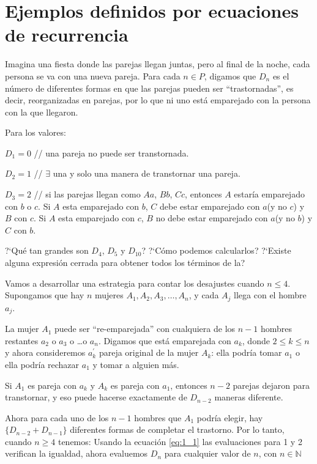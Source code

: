 \section{Ejemplos definidos por ecuaciones de recurrencia}
\begin{example}{}
	Imagina una fiesta donde las parejas llegan juntas, pero al final de la noche, cada persona se va con una nueva pareja. Para cada $n\in P$, digamos que $D_{n}$ es el número de diferentes formas en que las parejas pueden ser ``trastornadas'', es decir, reorganizadas en parejas, por lo que ni uno está emparejado con la persona con la que llegaron.
	
	Para los valores:
	
	$D_{1} = 0$  // una pareja no puede ser transtornada.
	
	$D_{2} = 1$  // $\exists$ una y solo una manera de transtornar una pareja.
	
	$D_{3} = 2$  // si las parejas llegan como $Aa$, $Bb$, $Cc$, entonces $A$ estaría emparejado con $b$ o $c$. Si $A$ esta emparejado con $b$, $C$ debe estar emparejado con $a$(y no $c$) y $B$ con $c$. Si $A$ esta emparejado con $c$, $B$ no debe estar emparejado con $a$(y no $b$) y $C$ con $b$.
	
	?`Qué tan grandes son $D_{4}$, $D_{5}$ y $D_{10}$? ?`Cómo podemos calcularlos? ?`Existe alguna expresión cerrada para obtener todos los términos de la? %
	
	Vamos a desarrollar una estrategia para contar los desajustes cuando $n\leq4$. Supongamos que hay $n$ mujeres $A_{1},A_{2},A_{3},\ldots,A_{n}$, y cada $A_{j}$ llega con el hombre $a_{j}$.
	
	La mujer $A_{1}$ puede ser ``re-emparejada'' con cualquiera de los $n-1$ hombres restantes $a_{2}$ o $a_{3}$ o \ldots o $a_{n}$. Digamos que está emparejada con $a_{k}$, donde $2\leq k\leq n$ y ahora consideremos $a_{k}^{\prime}$ pareja original de la mujer $A_{k}$: ella podría tomar $a_{1}$ o ella podría rechazar $a_{1}$ y tomar a alguien más.
	
	Si $A_{1}$ es pareja con $a_{k}$ y $A_{k}$ es pareja con $a_{1}$, entonces $n-2$ parejas dejaron para transtornar, y eso puede hacerse exactamente de $D_{n-2}$ maneras diferente.
	
	Ahora para cada uno de los $n-1$ hombres que $A_{1}$ podría elegir, hay $\{D_{n-2}+ D_{n-1}\}$ diferentes formas de completar el trastorno. Por lo tanto, cuando $n\geq 4$ tenemos:
Usando la ecuación \eqref{eq:1_1} las evaluaciones para 1 y 2 verifican la igualdad, ahora evaluemos $D_{n}$ para cualquier valor de $n$, con $n\in\mathds{N}$


\end{example}
